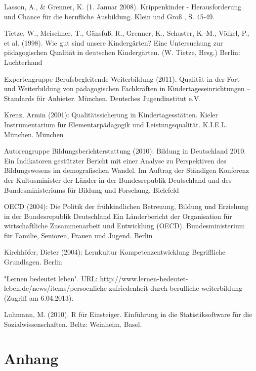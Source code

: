 \documentclass[12pt,a4paper]{article}
\begin{document}
Lasson, A., \& Grenner, K. (1. Januar 2008). Krippenkinder - Herausforderung und Chance für die berufliche Ausbildung. Klein und Groß , S. 45-49.

Tietze, W., Meischner, T., Gänsfuß, R., Grenner, K., Schuster, K.-M., Völkel, P., et al. (1998). Wie gut sind unsere Kindergärten? Eine Untersuchung zur pädagogischen Qualität in deutschen Kindergärten. (W. Tietze, Hrsg.) Berlin: Luchterhand

Expertengruppe Berufsbegleitende Weiterbildung (2011). Qualität in der Fort- und Weiterbildung von pädagogischen Fachkräften in Kindertageseinrichtungen – Standards für Anbieter. München. Deutsches Jugendinstitut e.V. 

Krenz, Armin (2001): Qualitätssicherung in Kindertagesstätten. Kieler Instrumentarium für Elementarpädagogik und Leistungsqualität. K.I.E.L. München. München

Autorengruppe Bildungsberichterstattung (2010): 
Bildung in Deutschland 2010. Ein Indikatoren gestützter Bericht mit einer Analyse zu Perspektiven des Bildungswesens im demografischen Wandel. Im Auftrag der Ständigen Konferenz der Kultusminister der Länder in der Bundesrepublik Deutschland und des Bundesministeriums für Bildung und Forschung. Bielefeld

OECD (2004): Die Politik der frühkindlichen Betreuung, Bildung und Erziehung in der Bundesrepublik Deutschland Ein Länderbericht der Organisation für wirtschaftliche Zusammenarbeit und Entwicklung (OECD). Bundesministerium für Familie, Senioren, Frauen und Jugend. Berlin

Kirchhöfer, Dieter (2004): Lernkultur Kompetenzentwicklung Begriffliche Grundlagen. Berlin 

"Lernen bedeutet leben". URL: http://www.lernen-bedeutet-leben.de/news/items/persoenliche-zufriedenheit-durch-berufliche-weiterbildung (Zugriff am 6.04.2013).

Luhmann, M. (2010). R für Einsteiger. Einführung in die Statistiksoftware für die Sozialwissenschaften. Beltz: Weinheim, Basel.

\pagebreak

\begin{appendix}
\section*{Anhang}
\normalsize
\section{}
  
\end{appendix}
\end{document}
